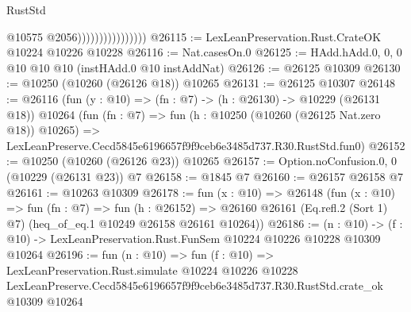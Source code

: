 \begin{lexlean}{RustStd}
\begin{coremodule}
                                    @10575
                                    @2056))))))))))))))))
@26115 := LexLeanPreservation.Rust.CrateOK @10224 @10226 @10228
@26116 := Nat.casesOn.{0}
@26125 := HAdd.hAdd.{0, 0, 0} @10 @10 @10 (instHAdd.{0} @10 instAddNat)
@26126 := @26125 @10309
@26130 := @10250 (@10260 (@26126 @18)) @10265
@26131 := @26125 @10307
@26148 := @26116
    (fun (y : @10) => (fn : @7) -> (h : @26130) -> @10229 (@26131 @18))
    @10264
    (fun (fn : @7) =>
    fun (h : @10250 (@10260 (@26125 Nat.zero @18)) @10265) =>
    LexLeanPreserve.Cecd5845e6196657f9f9ceb6e3485d737.R30.RustStd.fun0)
@26152 := @10250 (@10260 (@26126 @23)) @10265
@26157 := Option.noConfusion.{0, 0} (@10229 (@26131 @23)) @7
@26158 := @1845 @7
@26160 := @26157 @26158 @7
@26161 := @10263 @10309
@26178 := fun (x : @10) =>
  @26148
    (fun (x : @10) =>
    fun (fn : @7) =>
    fun (h : @26152) =>
    @26160 @26161 (Eq.refl.{2} (Sort 1) @7) (heq_of_eq.{1} @10249 @26158 @26161 @10264))
@26186 := (n : @10) ->
  (f : @10) -> LexLeanPreservation.Rust.FunSem @10224 @10226 @10228 @10309 @10264
@26196 := fun (n : @10) =>
  fun (f : @10) =>
  LexLeanPreservation.Rust.simulate
    @10224
    @10226
    @10228
    LexLeanPreserve.Cecd5845e6196657f9f9ceb6e3485d737.R30.RustStd.crate_ok
    @10309
    @10264
\end{coremodule}
\end{lexlean}
